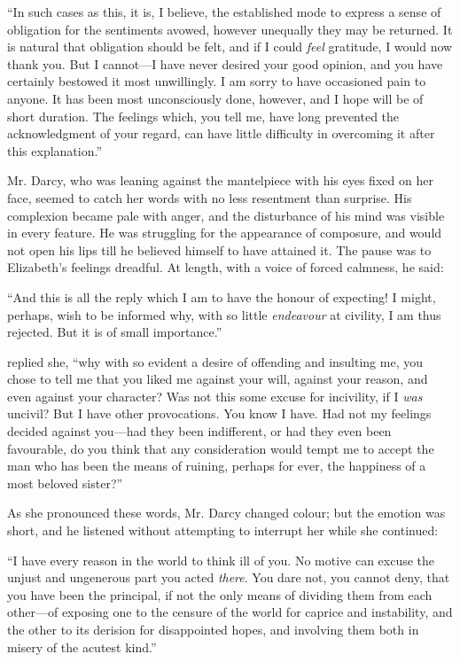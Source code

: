 “In such cases as this, it is, I believe, the established mode to express a sense of obligation for the sentiments avowed, however unequally they may be returned. It is natural that obligation should be felt, and if I could {\em feel} gratitude, I would now thank you. But I cannot---I have never desired your good opinion, and you have certainly bestowed it most unwillingly. I am sorry to have occasioned pain to anyone. It has been most unconsciously done, however, and I hope will be of short duration. The feelings which, you tell me, have long prevented the acknowledgment of your regard, can have little difficulty in overcoming it after this explanation.”

Mr. Darcy, who was leaning against the mantelpiece with his eyes fixed on her face, seemed to catch her words with no less resentment than surprise. His complexion became pale with anger, and the disturbance of his mind was visible in every feature. He was struggling for the appearance of composure, and would not open his lips till he believed himself to have attained it. The pause was to Elizabeth's feelings dreadful. At length, with a voice of forced calmness, he said:

“And this is all the reply which I am to have the honour of expecting! I might, perhaps, wish to be informed why, with so little {\em endeavour} at civility, I am thus rejected. But it is of small importance.”

 replied she, “why with so evident a desire of offending and insulting me, you chose to tell me that you liked me against your will, against your reason, and even against your character? Was not this some excuse for incivility, if I {\em was} uncivil? But I have other provocations. You know I have. Had not my feelings decided against you---had they been indifferent, or had they even been favourable, do you think that any consideration would tempt me to accept the man who has been the means of ruining, perhaps for ever, the happiness of a most beloved sister?”

As she pronounced these words, Mr. Darcy changed colour; but the emotion was short, and he listened without attempting to interrupt her while she continued:

“I have every reason in the world to think ill of you. No motive can excuse the unjust and ungenerous part you acted {\em there}. You dare not, you cannot deny, that you have been the principal, if not the only means of dividing them from each other---of exposing one to the censure of the world for caprice and instability, and the other to its derision for disappointed hopes, and involving them both in misery of the acutest kind.”

